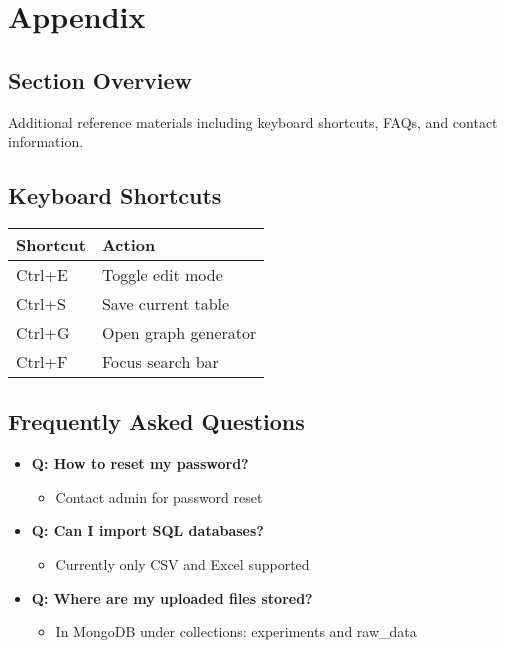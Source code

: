 \documentclass[12pt]{article}
\begin{document}
\section{Appendix}
\subsection*{Section Overview}
Additional reference materials including keyboard shortcuts, FAQs, and contact
information.

\subsection{Keyboard Shortcuts}
\begin{table}[H]
    \centering
    \begin{tabularx}{\textwidth}{lX}
        \toprule
        \textbf{Shortcut} & \textbf{Action} \\
        \midrule
        Ctrl+E & Toggle edit mode \\
        Ctrl+S & Save current table \\
        Ctrl+G & Open graph generator \\
        Ctrl+F & Focus search bar \\
        \bottomrule
    \end{tabularx}
\end{table}

\subsection{Frequently Asked Questions}
\begin{itemize}
    \item \textbf{Q: How to reset my password?}
    \begin{itemize}
        \item Contact admin for password reset
    \end{itemize}
    
    \item \textbf{Q: Can I import SQL databases?}
    \begin{itemize}
        \item Currently only CSV and Excel supported
    \end{itemize}
    
    \item \textbf{Q: Where are my uploaded files stored?}
    \begin{itemize}
        \item In MongoDB under collections: experiments and raw\_data
    \end{itemize}
\end{itemize}
\end{document}
